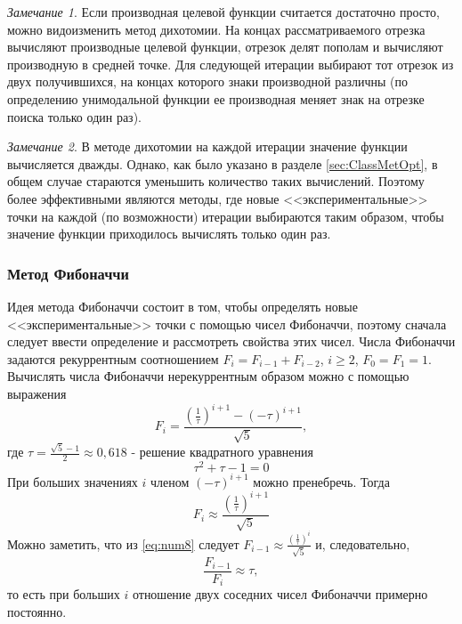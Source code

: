 \documentclass[a4paper,12pt]{report}
\begin{document}
\textit{Замечание 1}. Если производная целевой функции считается достаточно просто, можно видоизменить метод дихотомии. На концах рассматриваемого отрезка вычисляют производные целевой функции, отрезок делят пополам и вычисляют производную в средней точке. Для следующей итерации выбирают тот отрезок из двух получившихся, на концах которого знаки производной различны (по определению унимодальной функции ее производная меняет знак на отрезке поиска только один раз).

\textit{Замечание 2}. В методе дихотомии на каждой итерации значение функции вычисляется дважды. Однако, как было указано в разделе \ref{sec:ClassMetOpt}, в общем случае стараются уменьшить количество таких вычислений. Поэтому более эффективными являются методы, где новые <<экспериментальные>> точки на каждой (по возможности) итерации выбираются таким образом, чтобы значение функции приходилось вычислять только один раз.

\subsubsection{Метод Фибоначчи}
Идея метода Фибоначчи состоит в том, чтобы определять новые <<экспериментальные>> точки с помощью чисел Фибоначчи, поэтому сначала следует ввести определение и рассмотреть свойства этих чисел. Числа Фибоначчи задаются рекуррентным соотношением $F_{i} = F_{i-1} + F_{i-2}$, $i \geq 2$, $F_{0} = F_{1} = 1$. Вычислять числа Фибоначчи нерекуррентным образом можно с помощью выражения
\begin{equation}
\label{eq:num6}
F_{i} = \frac{\left(\frac{1}{\tau}\right)^{i+1}-\left(-\tau\right)^{i+1}}{\sqrt{5}},
\end{equation}
где $\tau = \frac{\sqrt{5} - 1}{2} \approx 0,618$ - решение квадратного уравнения
\begin{equation}
\label{eq:num7}
\tau^{2} + \tau - 1 = 0
\end{equation}
При больших значениях $i$ членом $\left(-\tau\right)^{i+1}$ можно пренебречь. Тогда
\begin{equation}
\label{eq:num8}
F_{i} \approx \frac{\left(\frac{1}{\tau}\right)^{i+1}}{\sqrt{5}}
\end{equation}
Можно заметить, что из \eqref{eq:num8} следует $F_{i-1} \approx \frac{\left(\frac{1}{\tau}\right)^{i}}{\sqrt{5}}$ и, следовательно,
\begin{equation}
\label{eq:num9}
\frac{F_{i-1}}{F_{i}} \approx \tau,
\end{equation}
то есть при больших $i$ отношение двух соседних чисел Фибоначчи примерно постоянно.
\end{document}

